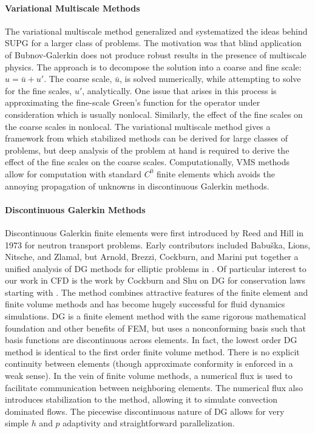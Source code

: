 \documentclass[Proposal.tex]{subfiles}
\begin{document}
\paragraph{Variational Multiscale Methods}
The variational multiscale method generalized and systematized the ideas behind SUPG for a larger class of problems.
The motivation was that blind application of Bubnov-Galerkin does not produce robust results in the presence of multiscale physics\cite{VMS}.
The approach is to decompose the solution into a coarse and fine scale: $u=\bar u+u'$. The coarse scale, $\bar u$, is solved numerically,
while attempting to solve for the fine scales, $u'$, analytically.
One issue that arises in this process is approximating the fine-scale Green's function for the operator under consideration which is usually nonlocal.
Similarly, the effect of the fine scales on the coarse scales in nonlocal.
The variational multiscale method gives a framework from which stabilized methods can be derived for large classes of problems,
but deep analysis of the problem at hand is required to derive the effect of the fine scales on the coarse scales.
Computationally, VMS methods allow for computation with standard $C^0$ finite elements which avoids the annoying propagation of unknowns in
discontinuous Galerkin methods.

\paragraph{Discontinuous Galerkin Methods}
Discontinuous Galerkin finite elements were first introduced by Reed and Hill in 1973 for neutron transport problems\cite{ReedHillDG}.
Early contributors included Babu\v{s}ka, Lions, Nitsche, and Zlamal, but Arnold, Brezzi, Cockburn, and Marini put together a unified analysis
of DG methods for elliptic problems in \cite{ArnoldDG}. 
Of particular interest to our work in CFD is the work by Cockburn and Shu on DG for conservation laws starting with \cite{CockburnShuDG}.
The method combines attractive features of the finite element and finite volume methods and has become hugely successful for fluid dynamics simulations.
DG is a finite element method with the same rigorous mathematical foundation and other benefits of FEM, but uses a nonconforming basis such that basis
functions are discontinuous across elements.
In fact, the lowest order DG method is identical to the first order finite volume method.
There is no explicit continuity between elements (though approximate conformity is enforced in a weak sense). 
In the vein of finite volume methods, a numerical flux is used to facilitate communication between neighboring elements.
The numerical flux also introduces stabilization to the method, allowing it to simulate convection dominated flows.
The piecewise discontinuous nature of DG allows for very simple $h$ and $p$ adaptivity and straightforward parallelization.
\end{document}
